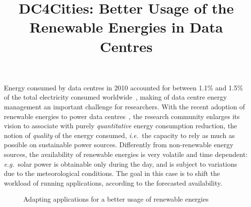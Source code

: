 \documentclass[conference]{IEEEtran}
\newcommand{\ie}{\emph{i.e.}}
\newcommand{\eg}{{\em e.g.}}
\begin{document}
\title{DC4Cities: Better Usage of the Renewable Energies in Data Centres}

\author{
\and
{}
\and
{}
}

\maketitle

Energy consumed by data centres in 2010 accounted for between 1.1\% and 1.5\% of the total electricity consumed worldwide~\cite{Koomey2011}, making of data centre energy ma\-nagement an important challenge for researchers.
With the recent adoption of renewable energies to power data centres~\cite{parasol-sigplan2013}, the research community enlarges its vision to associate with purely \emph{quantitative} energy consumption reduction, the notion of \emph{quality} of the energy consumed, \ie\ the capacity to rely as much as possible on sustainable power sources.
Differently from non-renewable energy sources, the availability of renewable energies is very volatile and time dependent: \eg\ solar power is obtainable only during the day, and is subject to variations due to the meteorological conditions.
The goal in this case is to shift the workload of running applications, according to the forecasted availability.

\begin{figure}[ht!]
  \centering
  \caption{Adapting applications for a better usage of renewable energies}
  \label{fig:adapt}
  \vspace{-1em}
\end{figure}
\end{document}
